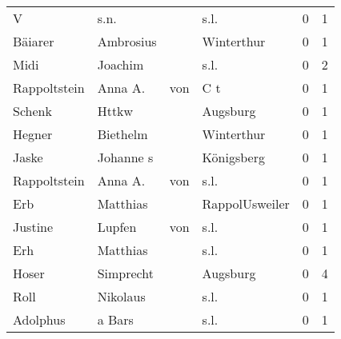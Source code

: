 \begin{tabular}{llllrr}
                        V &                               s.n. &             &                                        s.l. &          0 &         1 \\
                  Bäiarer &                          Ambrosius &             &                                  Winterthur &          0 &         1 \\
                     Midi &                            Joachim &             &                                        s.l. &          0 &         2 \\
             Rappoltstein &                            Anna A. &         von &                                         C t &          0 &         1 \\
                   Schenk &                              Httkw &             &                                    Augsburg &          0 &         1 \\
                   Hegner &                           Biethelm &             &                                  Winterthur &          0 &         1 \\
                    Jaske &                          Johanne s &             &                                  Königsberg &          0 &         1 \\
             Rappoltstein &                            Anna A. &         von &                                        s.l. &          0 &         1 \\
                      Erb &                           Matthias &             &                              RappolUsweiler &          0 &         1 \\
                  Justine &                             Lupfen &         von &                                        s.l. &          0 &         1 \\
                      Erh &                           Matthias &             &                                        s.l. &          0 &         1 \\
                    Hoser &                          Simprecht &             &                                    Augsburg &          0 &         4 \\
                     Roll &                           Nikolaus &             &                                        s.l. &          0 &         1 \\
                 Adolphus &                             a Bars &             &                                        s.l. &          0 &         1 \\

\end{tabular}
